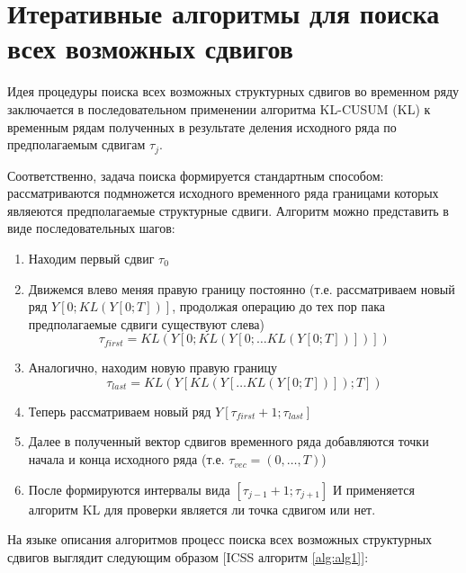 \documentclass[a4paper,14pt,russian]{extarticle}
\begin{document}
	\section{\label{sec:sec2}Итеративные алгоритмы для поиска всех возможных сдвигов}
	Идея процедуры поиска всех возможных структурных сдвигов во временном ряду заключается в последовательном применении алгоритма KL-CUSUM (KL) к временным рядам полученных в результате деления исходного ряда по предполагаемым сдвигам $\tau_j$.
	\par
	Соответственно, задача поиска формируется стандартным способом: рассматриваются подмножется исходного временного ряда границами которых являеются предполагаемые структурные сдвиги. Алгоритм можно представить в виде последовательных шагов:
	\begin{enumerate}
		\item Находим первый сдвиг $\tau_0$ 
		\item Движемся влево меняя правую границу постоянно (т.е. рассматриваем новый ряд $Y\left[0; KL(Y\left[0; T\right])\right]$, продолжая операцию до тех пор пака предполагаемые сдвиги существуют слева)
		\begin{equation}
			\tau_{first} = KL(Y\left[0; KL(Y\left[0; \dots KL(Y\left[0; T\right]) \right] )   \right])
		\end{equation}
		\item Аналогично, находим новую правую границу
			\begin{equation}
				\tau_{last} = KL(Y\left[KL(Y\left[ \dots KL(Y\left[0; T\right])\right]); T\right])
			\end{equation}
		\item Теперь рассматриваем новый ряд $Y\left[\tau_{first} + 1; \tau_{last}\right]$
		\item Далее в полученный вектор сдвигов временного ряда добавляются точки начала и конца исходного ряда (т.е. $\tau_{vec} = \left( 0, \dots, T \right)$)
		\item После формируются интервалы вида $\left[ \tau_{j - 1} + 1; \tau_{j + 1} \right]$ И применяется алгоритм KL для проверки является ли точка сдвигом или нет.
	\end{enumerate}
	\par
	На языке описания алгоритмов процесс поиска всех возможных структурных сдвигов выглядит следующим образом [ICSS алгоритм \ref{alg:alg1}]:
\end{document}

